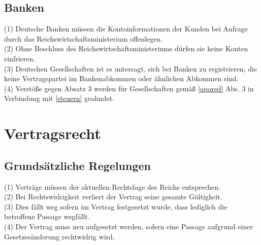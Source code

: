 \documentclass{article}
\begin{document}
\subsection{Banken}
(1) Deutsche Banken müssen die Kontoinformationen der Kunden bei Anfrage durch das Reichswirtschaftsministerium offenlegen.\\
(2) Ohne Beschluss des Reichswirtschaftsministeriums dürfen sie keine Konten einfrieren.\\
(3) Deutschen Gesellschaften ist es untersagt, sich bei Banken zu registrieren, die keine Vertragspartei im Bankenabkommen oder ähnlichen Abkommen sind.\\
(4) Verstöße gegen Absatz 3 werden für Gesellschaften gemäß \ref{apored} Abs. 3 in Verbindung mit \ref{steuern} geahndet.\\

\section{Vertragsrecht}
\subsection{Grundsätzliche Regelungen}
(1) Verträge müssen der aktuellen Rechtslage des Reichs entsprechen.\\
(2) Bei Rechtswidrigkeit verliert der Vertrag seine gesamte Gültigkeit.\\
(3) Dies fällt weg sofern im Vertrag festgesetzt wurde, dass lediglich die betroffene Passage wegfällt.\\
(4) Der Vertrag muss neu aufgesetzt werden, sofern eine Passage aufgrund einer Gesetzesänderung rechtwidrig wird.
\end{document}

